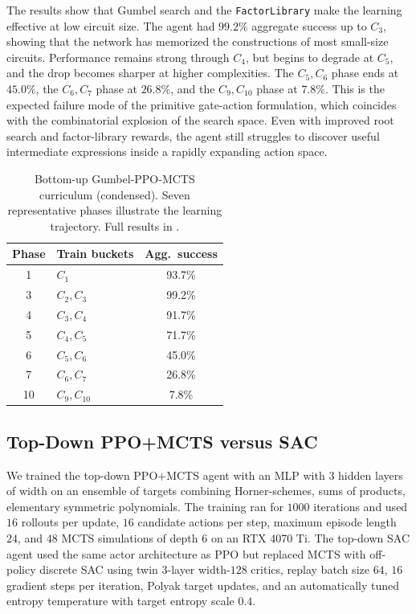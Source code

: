 \documentclass{article}
\theoremstyle{definition}
\theoremstyle{remark}
\begin{document}
The results show that Gumbel search and the \texttt{FactorLibrary} make the learning effective at low circuit size. The agent had \(99.2\%\) aggregate success up to \(C_3\), showing that the network has memorized the constructions of most small-size circuits. Performance remains strong through \(C_4\), but begins to degrade at \(C_5\), and the drop becomes sharper at higher complexities. The \(C_5,C_6\) phase ends at \(45.0\%\), the \(C_6,C_7\) phase at \(26.8\%\), and the \(C_9,C_{10}\) phase at \(7.8\%\). This is the expected failure mode of the primitive gate-action formulation, which coincides with the combinatorial explosion of the search space. Even with improved root search and factor-library rewards, the agent still struggles to discover useful intermediate expressions inside a rapidly expanding action space. 

\begin{table}[h]
\centering
\caption{Bottom-up Gumbel-PPO-MCTS curriculum (condensed). Seven representative phases illustrate the learning trajectory. Full results in .}
\label{tab:bottomup-condensed}
\small
\setlength{\tabcolsep}{5pt}
\begin{tabular}{@{}clc@{}}
\toprule
Phase & Train buckets & Agg.\ success \\
\midrule
1  & $C_1$          & 93.7\% \\
3  & $C_2,C_3$      & 99.2\% \\
4  & $C_3,C_4$      & 91.7\% \\
5  & $C_4,C_5$      & 71.7\% \\
6  & $C_5,C_6$      & 45.0\% \\
7  & $C_6,C_7$      & 26.8\% \\
10 & $C_9,C_{10}$   & 7.8\%  \\
\bottomrule
\end{tabular}
\end{table}

\subsection{Top-Down PPO+MCTS versus SAC}

We trained the top-down PPO+MCTS agent with an MLP with $3$ hidden layers of width on an ensemble of targets combining Horner-schemes, sums of products, elementary symmetric polynomials. The training ran for \(1000\) iterations and used \(16\) rollouts per update, \(16\) candidate actions per step, maximum episode length \(24\), and \(48\) MCTS simulations of depth \(6\) on an RTX 4070 Ti.  The top-down SAC agent used the same actor architecture as PPO but replaced MCTS with off-policy discrete SAC using twin \(3\)-layer width-\(128\) critics, replay batch size \(64\), \(16\) gradient steps per iteration, Polyak target updates, and an automatically tuned entropy temperature with target entropy scale \(0.4\). 
\end{document}
